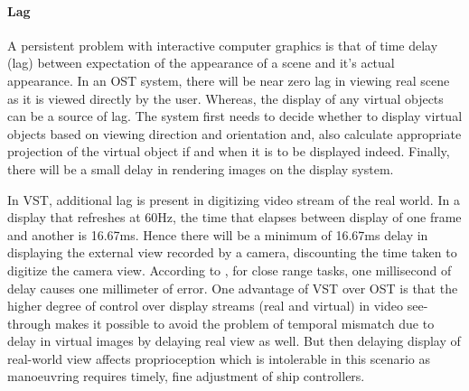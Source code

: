 \paragraph{Lag}
A persistent problem with interactive computer graphics is that of time delay (lag) between expectation of the appearance of a scene and it's actual appearance. In an OST system, there will be near zero lag in viewing real scene as it is viewed directly by the user. Whereas, the display of any virtual objects can be a source of lag. The system first needs to decide whether to display virtual objects based on viewing direction and orientation and, also calculate appropriate projection of the virtual object if and when it is to be displayed indeed. Finally, there will be a small delay in rendering images on the display system. 

In VST, additional lag is present in digitizing video stream of the real world. In a display that refreshes at 60Hz, the time that elapses between display of one frame and another is 16.67ms. Hence there will be a minimum of 16.67ms delay in displaying the external view recorded by a camera, discounting the time taken to digitize the camera view. According to \parencite{ellis1997factors}, for close range tasks, one millisecond of delay causes one millimeter of error. One advantage of VST over OST is that the higher degree of control over display streams (real and virtual) in video see-through makes it possible to avoid the problem of temporal mismatch due to delay in virtual images by delaying real view as well. But then delaying display of real-world view affects proprioception which is intolerable in this scenario as manoeuvring requires timely, fine adjustment of ship controllers.
	





